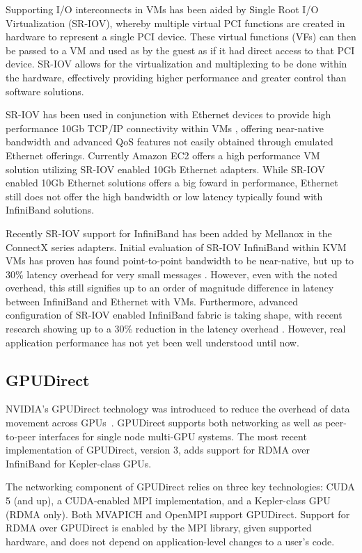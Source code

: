 \documentclass{sigplanconf}
\begin{document}
Supporting I/O interconnects in VMs has been aided by Single Root I/O Virtualization (SR-IOV), whereby multiple virtual PCI functions are created in hardware to represent a single PCI device. These virtual functions (VFs) can then be passed to a VM and used as by the guest as if it had direct access to that PCI device. SR-IOV allows for the virtualization and multiplexing to be done within the hardware, effectively providing higher performance and greater control than software solutions. 

SR-IOV has been used in conjunction with Ethernet devices to provide high performance 10Gb TCP/IP connectivity within VMs \cite{Liu2010}, offering near-native bandwidth and advanced QoS features not easily obtained through emulated Ethernet offerings. Currently Amazon EC2 offers a high performance VM solution utilizing SR-IOV enabled 10Gb Ethernet adapters. While SR-IOV enabled 10Gb Ethernet solutions offers a big foward in performance, Ethernet still does not offer the high bandwidth or low latency typically found with InfiniBand solutions. 

Recently SR-IOV support for InfiniBand has been added by Mellanox in the ConnectX series adapters. Initial evaluation of SR-IOV InfiniBand within KVM VMs has proven has found point-to-point bandwidth to be near-native, but up to 30\% latency overhead for very small messages \cite{jose2013sr, RuivoAGTKNR14}. However, even with the noted overhead, this still signifies up to an order of magnitude difference in latency between InfiniBand and Ethernet with VMs. Furthermore, advanced configuration of SR-IOV enabled InfiniBand fabric is taking shape, with recent research showing up to a 30\% reduction in the latency overhead \cite{Musleh2014cloud}. However, real application performance has not yet been well understood until now. 

\subsection{GPUDirect}
NVIDIA's GPUDirect technology was introduced to reduce the overhead of data
movement across GPUs~\cite{GPUDirect, shainer2011development}.  GPUDirect
supports both networking as
well as peer-to-peer interfaces for single node multi-GPU systems.  The most
recent implementation of GPUDirect, version 3, adds support for RDMA over
InfiniBand for Kepler-class GPUs.

The networking component of GPUDirect relies on three key technologies: CUDA 5
(and up), a CUDA-enabled MPI implementation, and a Kepler-class GPU (RDMA only).
Both MVAPICH and OpenMPI support GPUDirect.  Support for RDMA over GPUDirect is
enabled by the MPI library, given supported hardware, and does not depend on
application-level changes to a user's code.
\end{document}
